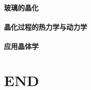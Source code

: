 \documentclass[UTF8]{../NatureUniverse}
\begin{document}
\subsubsection{玻璃的晶化}
\subsubsection{晶化过程的热力学与动力学}
\subsubsection{应用晶体学}














\chapter{END}
\end{document}
